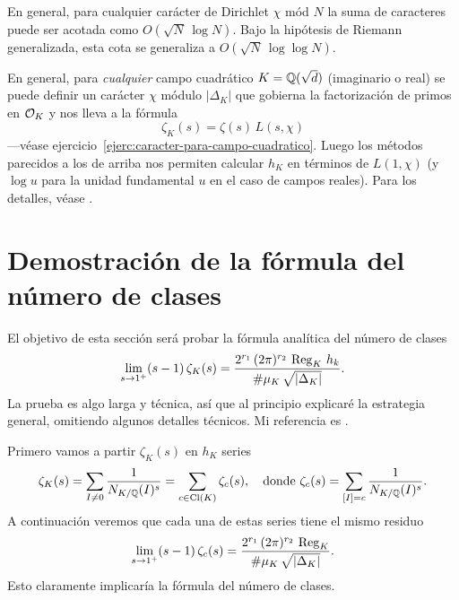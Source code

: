 \begin{comentario}
  En general, para cualquier carácter de Dirichlet $\chi$ mód $N$ la suma de
  caracteres puede ser acotada como $O (\sqrt{N}\,\log N)$. Bajo la hipótesis
  de Riemann generalizada, esta cota se generaliza a
  $O (\sqrt{N}\,\log\log N)$.
\end{comentario}

\begin{comentario}
  En general, para \emph{cualquier} campo cuadrático $K = \mathbb{Q} (\sqrt{d})$
  (imaginario o real) se puede definir un carácter $\chi$ módulo $|\Delta_K|$
  que gobierna la factorización de primos en $\mathcal{O}_K$ y nos lleva a la fórmula
  $$\zeta_K (s) = \zeta (s) \, L (s,\chi)$$
  ---véase ejercicio~\ref{ejerc:caracter-para-campo-cuadratico}.
  Luego los métodos parecidos a los de arriba nos permiten calcular $h_K$
  en términos de $L (1,\chi)$ (y $\log u$ para la unidad fundamental $u$ en el
  caso de campos reales). Para los detalles, véase
  \cite[Chapter~5]{Borevich-Shafarevich}.
\end{comentario}


\section{Demostración de la fórmula del número de clases}

El objetivo de esta sección será probar la fórmula analítica del número de
clases
\[ \lim_{s \to 1^+} (s - 1)\,\zeta_K (s) =
   \frac{2^{r_1}\,(2\pi)^{r_2}\,\operatorname{Reg}_K\,h_k}{\#\mu_K\,\sqrt{|\Delta_K|}}. \]
La prueba es algo larga y técnica, así que al principio explicaré la estrategia
general, omitiendo algunos detalles técnicos. Mi referencia es
\cite{Borevich-Shafarevich}.

Primero vamos a partir
$\zeta_K (s)$ en $h_K$ series
\[ \zeta_K (s) = \sum_{I\ne 0} \frac{1}{N_{K/\mathbb{Q}} (I)^s} =
   \sum_{c\in \operatorname{Cl} (K)} \zeta_c (s),
   \quad\text{donde }
   \zeta_c (s) = \sum_{[I] = c} \frac{1}{N_{K/\mathbb{Q}} (I)^s}. \]
A continuación veremos que cada una de estas series tiene el mismo residuo
\[ \lim_{s \to 1^+} (s - 1)\,\zeta_c (s) =
   \frac{2^{r_1}\,(2\pi)^{r_2}\,\operatorname{Reg}_K}{\#\mu_K\,\sqrt{|\Delta_K|}}. \]
Esto claramente implicaría la fórmula del número de clases.

\vspace{1em}

